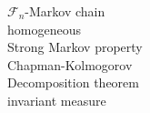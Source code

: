 \documentclass[paper=a4, fontsize=11pt]{scrartcl} %
\numberwithin{equation}{section} %
\numberwithin{figure}{section} %
\numberwithin{table}{section} %
\begin{document}
$\mathcal{F}_n$-Markov chain\\
homogeneous\\
Strong Markov property\\
Chapman-Kolmogorov\\
Decomposition theorem\\
invariant measure\\
\end{document}
